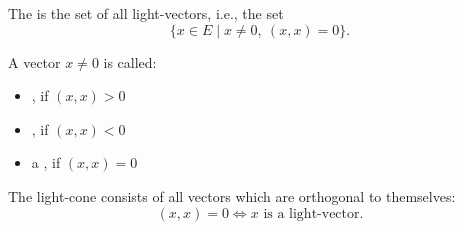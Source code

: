 The  is the set of all light-vectors, i.e., the set
$$\{x \in E \mid x \neq 0,\ (x, x) = 0\}.$$

A vector $x \neq 0$ is called:
\begin{itemize}
  \item {}, if $(x, x) > 0$
  \item {}, if $(x, x) < 0$
  \item a , if $(x, x) = 0$
\end{itemize}

The light-cone consists of all vectors which are orthogonal to themselves:
$$(x, x) = 0 \iff x \text{ is a light-vector}.$$
